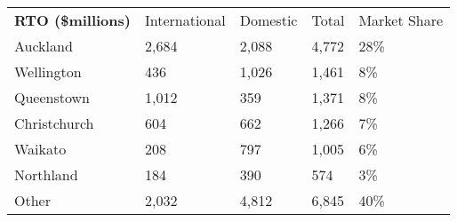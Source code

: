 \begin{tabular}[t]{p{2cm}>{\hfill}p{1.45cm}>{\hfill}p{1cm}>{\hfill}p{0.9cm}>{\hfill}p{1.35cm}}
 \textbf{RTO (\$millions)} & International & Domestic & Total & Market Share \\ 
 Auckland & 2,684 & 2,088 & 4,772 & 28\% \\ 
  Wellington & 436 & 1,026 & 1,461 & 8\% \\ 
  Queenstown & 1,012 & 359 & 1,371 & 8\% \\ 
  Christchurch & 604 & 662 & 1,266 & 7\% \\ 
  Waikato & 208 & 797 & 1,005 & 6\% \\ 
  Northland & 184 & 390 & 574 & 3\% \\ 
  Other & 2,032 & 4,812 & 6,845 & 40\% \\ 
  \end{tabular}
